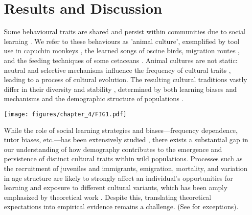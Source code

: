 \section{Results and Discussion}

\lettrine[lines=2,slope=0pt, nindent=5pt]Some behavioural traits are shared and persist within communities due to social learning \parencite{viciana2021}. We refer to these behaviours as 'animal culture', exemplified by tool use in capuchin monkeys \parencite{falotico2019}, the learned songs of oscine birds, migration routes \parencite{jesmer2018, berdahl2018, byholm2022}, and the feeding techniques of some cetaceans \parencite{allen2013, rendell2001}. Animal cultures are not static: neutral and selective mechanisms influence the frequency of cultural traits \parencite{potvin2015, williams2021}, leading to a process of cultural evolution. The resulting cultural traditions vastly differ in their diversity and stability \parencite{tchernichovski2017}, determined by both learning biases and mechanisms and the demographic structure of populations \parencite{deffner2022a, kandler2017}. 

\begin{figure*}[hbt!]
    \centering
    \texttt{[image: figures/chapter\_4/FIG1.pdf]}
    \label{c4_fig:main}
\end{figure*}

While the role of social learning strategies and biases---frequency dependence, tutor biases, etc.---has been extensively studied \parencite{pike2010, kendal2015, aplin2017, lachlan2018, tchernichovski2021}, there exists a substantial gap in our understanding of how demography contributes to the emergence and persistence of distinct cultural traits within wild populations. Processes such as the recruitment of juveniles and immigrants, emigration, mortality, and variation in age structure are likely to strongly affect an individual's opportunities for learning and exposure to different cultural variants, which has been amply emphasized by theoretical work \parencite{deffner2022a, deffner2022, kandler2023, fogarty2019, deffner2020, derex2016, kirby2021, nunn2009, barta2023}. Despite this, translating theoretical expectations into empirical evidence remains a challenge. (See \cite{chimento2021, fayet2014} for exceptions). 

